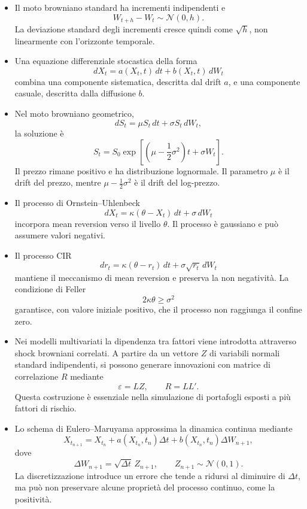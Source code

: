 \begin{itemize}

\item Il moto browniano standard ha incrementi indipendenti e
\[
W_{t+h}-W_t\sim\mathcal{N}(0,h).
\]
La deviazione standard degli incrementi cresce quindi come
$\sqrt{h}$, non linearmente con l'orizzonte temporale.

\item Una equazione differenziale stocastica della forma
\[
dX_t=a(X_t,t)\,dt+b(X_t,t)\,dW_t
\]
combina una componente sistematica, descritta dal drift $a$, e una
componente casuale, descritta dalla diffusione $b$.

\item Nel moto browniano geometrico,
\[
dS_t=\mu S_t\,dt+\sigma S_t\,dW_t,
\]
la soluzione \`{e}
\[
S_t
=
S_0
\exp\left[
\left(
\mu-\frac{1}{2}\sigma^2
\right)t+\sigma W_t
\right].
\]
Il prezzo rimane positivo e ha distribuzione lognormale. Il parametro
$\mu$ \`{e} il drift del prezzo, mentre
$\mu-\frac{1}{2}\sigma^2$ \`{e} il drift del log-prezzo.

\item Il processo di Ornstein--Uhlenbeck
\[
dX_t=\kappa(\theta-X_t)\,dt+\sigma\,dW_t
\]
incorpora mean reversion verso il livello $\theta$. Il processo \`{e}
gaussiano e pu\`{o} assumere valori negativi.

\item Il processo CIR
\[
dr_t
=
\kappa(\theta-r_t)\,dt+\sigma\sqrt{r_t}\,dW_t
\]
mantiene il meccanismo di mean reversion e preserva la non
negativit\`{a}. La condizione di Feller
\[
2\kappa\theta\geq\sigma^2
\]
garantisce, con valore iniziale positivo, che il processo non raggiunga
il confine zero.

\item Nei modelli multivariati la dipendenza tra fattori viene
introdotta attraverso shock browniani correlati. A partire da un
vettore $Z$ di variabili normali standard indipendenti, si possono
generare innovazioni con matrice di correlazione $R$ mediante
\[
\varepsilon=LZ,
\qquad
R=LL'.
\]
Questa costruzione \`{e} essenziale nella simulazione di portafogli
esposti a pi\`{u} fattori di rischio.

\item Lo schema di Eulero--Maruyama approssima la dinamica continua
mediante
\[
X_{t_{n+1}}
=
X_{t_n}
+
a(X_{t_n},t_n)\Delta t
+
b(X_{t_n},t_n)\Delta W_{n+1},
\]
dove
\[
\Delta W_{n+1}
=
\sqrt{\Delta t}\,Z_{n+1},
\qquad
Z_{n+1}\sim\mathcal{N}(0,1).
\]
La discretizzazione introduce un errore che tende a ridursi al
diminuire di $\Delta t$, ma pu\`{o} non preservare alcune propriet\`{a}
del processo continuo, come la positivit\`{a}.

\end{itemize}

